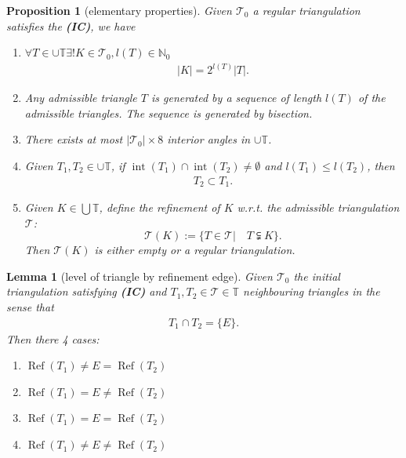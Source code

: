 \documentclass[a4paper,12pt,oneside,fleqn]{book}
\newtheorem{lemma}[theorem]{Lemma}
\newtheorem{proposition}[theorem]{Proposition}
\theoremstyle{definition}
\theoremstyle{remark}
\DeclareMathOperator*{\interior}{int}
\DeclareMathOperator*{\refine}{Ref}
\begin{document}
\begin{proposition}[elementary properties]
Given $\mathcal{T}_0$ a regular triangulation satisfies the \textbf{(IC)}, we have 
\begin{enumerate}
	\item $\forall T \in \cup \mathbb{T} \exists! K \in \mathcal{T}_0, l(T) \in \mathbb{N}_0$
	\begin{align*}
		|K| = 2^{l(T)} |T|. 
	\end{align*}
	\item Any admissible triangle $T$ is generated by a sequence of length $l(T)$ of the admissible triangles. The sequence is generated by bisection.
	\item There exists at most $|\mathcal{T}_0| \times 8$ interior angles in $\cup \mathbb{T}$. 
	\item Given $T_1, T_2 \in \cup \mathbb{T}$, if $\interior( T_1) \cap \interior( T_2) \neq \emptyset$ and $l(T_1) \le l(T_2)$, then
	\begin{align*}
		T_2 \subset T_1.
	\end{align*}
	\item Given $K \in \bigcup \mathbb{T}$, define the refinement of $K$ w.r.t. the admissible triangulation $\mathcal{T}$:
	\begin{equation}
		\mathcal{T}(K):= \{ T \in \mathcal{T}  | \quad T \subsetneqq K \}.
	\end{equation}
	Then $\mathcal{T}(K)$ is either empty or a regular triangulation.
\end{enumerate}
\end{proposition}


\begin{lemma}[level of triangle by refinement edge]
	Given $\mathcal{T}_0$ the initial triangulation satisfying \textbf{(IC)} and $T_1, T_2 \in \mathcal{T} \in \mathbb{T}$ neighbouring triangles in the sense that
	\begin{align*}
		T_1 \cap T_2 = \{E\}.
	\end{align*}
	Then there 4 cases:
	\begin{enumerate}
		\item $\refine(T_1) \neq E = \refine(T_2)$ 
		\item $\refine(T_1) = E \neq \refine(T_2)$
		\item $\refine(T_1) = E = \refine(T_2)$
		\item $\refine(T_1) \neq E \neq \refine(T_2)$
	\end{enumerate}
\end{lemma}
\end{document}
